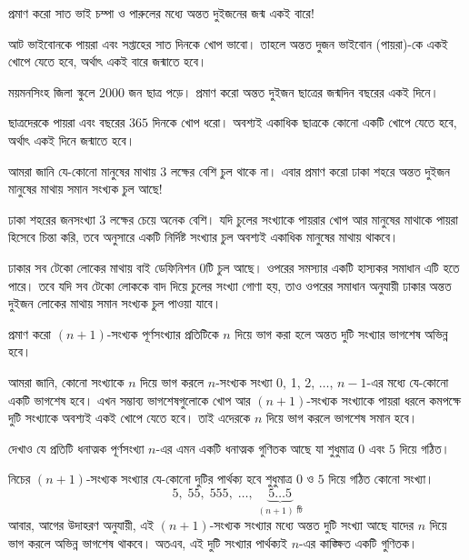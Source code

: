 \begin{example}
	প্রমাণ করো সাত ভাই চম্পা ও পারুলের মধ্যে অন্তত দুইজনের জন্ম একই বারে!
\end{example}
\begin{solution}
	আট ভাইবোনকে পায়রা এবং সপ্তাহের সাত দিনকে খোপ ভাবো। তাহলে অন্তত দুজন ভাইবোন (পায়রা)-কে একই খোপে যেতে হবে, অর্থাৎ একই বারে জন্মাতে হবে।
\end{solution}
\begin{example}
	ময়মনসিংহ জিলা স্কুলে $2000$ জন ছাত্র পড়ে। প্রমাণ করো অন্তত দুইজন ছাত্রের জন্মদিন বছরের একই দিনে।
\end{example}
\begin{solution}
	ছাত্রদেরকে পায়রা এবং বছরের $365$ দিনকে খোপ ধরো। অবশ্যই একাধিক ছাত্রকে কোনো একটি খোপে যেতে হবে, অর্থাৎ একই দিনে জন্মাতে হবে।
\end{solution}
\begin{example}
	আমরা জানি যে-কোনো মানুষের মাথায় $3$ লক্ষের বেশি চুল থাকে না। এবার প্রমাণ করো ঢাকা শহরে অন্তত দুইজন মানুষের মাথায় সমান সংখ্যক চুল আছে!
\end{example}
\begin{solution}
	ঢাকা শহরের জনসংখ্যা $3$ লক্ষের চেয়ে অনেক বেশি। যদি চুলের সংখ্যাকে পায়রার খোপ আর মানুষের মাথাকে পায়রা হিসেবে চিন্তা করি, তবে \phpname{} অনুসারে একটি নির্দিষ্ট সংখ্যার চুল অবশ্যই একাধিক মানুষের মাথায় থাকবে।
\end{solution}
\begin{remark}
	ঢাকার সব টেকো লোকের মাথায় বাই ডেফিনিশন $0$টি চুল আছে। ওপরের সমস্যার একটি হাস্যকর সমাধান এটি হতে পারে। তবে যদি সব টেকো লোককে বাদ দিয়ে চুলের সংখ্যা গোণা হয়, তাও ওপরের সমাধান অনুযায়ী ঢাকার অন্তত দুইজন লোকের মাথায় সমান সংখ্যক চুল পাওয়া যাবে।
\end{remark}


\begin{example}
	প্রমাণ করো $(n+1)$-সংখ্যক পূর্ণসংখ্যার প্রতিটিকে $n$ দিয়ে ভাগ করা হলে অন্তত দুটি সংখ্যার ভাগশেষ অভিন্ন হবে।
\end{example}
\begin{solution}
	আমরা জানি, কোনো সংখ্যাকে $n$ দিয়ে ভাগ করলে $n$-সংখ্যক সংখ্যা 0, 1, 2, $\ldots$, $n-1$-এর মধ্যে যে-কোনো একটি ভাগশেষ হবে। এখন সম্ভাব্য ভাগশেষগুলোকে খোপ আর $(n+1)$-সংখ্যক সংখ্যাকে পায়রা ধরলে কমপক্ষে দুটি সংখ্যাকে অবশ্যই একই খোপে যেতে হবে। তাই এদেরকে $n$ দিয়ে ভাগ করলে ভাগশেষ সমান হবে।
\end{solution}

\begin{example}
	দেখাও যে প্রতিটি ধনাত্মক পূর্ণসংখ্যা $n$-এর এমন একটি ধনাত্মক গুণিতক আছে যা শুধুমাত্র $0$ এবং $5$ দিয়ে গঠিত।
\end{example}
\begin{solution}
	নিচের $(n+1)$-সংখ্যক সংখ্যার যে-কোনো দুটির পার্থক্য হবে শুধুমাত্র $0$ ও $5$ দিয়ে গঠিত কোনো সংখ্যা।
	\[5, \;55, \;555, \;\ldots,\;\underbrace{5\ldots5}_{(n+1)\text{ টি}}\]
	আবার, আগের উদাহরণ  অনুযায়ী, এই $(n+1)$-সংখ্যক সংখ্যার মধ্যে অন্তত দুটি সংখ্যা আছে যাদের $n$ দিয়ে ভাগ করলে অভিন্ন ভাগশেষ থাকবে। অতএব, এই দুটি সংখ্যার পার্থক্যই $n$-এর কাঙ্ক্ষিত একটি গুণিতক।
\end{solution}

